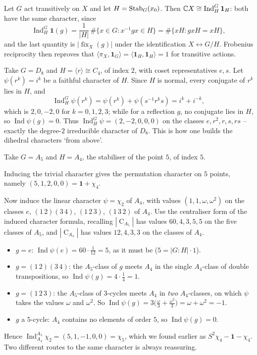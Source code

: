 \documentclass[a4paper]{scrartcl}
\newcommand{\Ind}{\operatorname{Ind}}
\newcommand{\Cent}{\operatorname{C}}
\newcommand{\ip}[2]{\langle #1, #2 \rangle}
\newcommand{\gen}[1]{\langle #1 \rangle}
\begin{document}
\begin{example}
	Let $G$ act transitively on $X$ and let $H = \operatorname{Stab}_G(x_0)$. Then $\C X \cong \Ind_H^G\mathbf 1_H$: both have the same character, since
	$$\Ind_H^G\mathbf 1(g) = \frac{1}{|H|}\,\#\{x\in G : x^{-1}gx\in H\} = \#\{xH : gxH = xH\},$$
	and the last quantity is $|\operatorname{fix}_X(g)|$ under the identification $X \leftrightarrow G/H$. Frobenius reciprocity then reproves that $\ip{\pi_X}{\mathbf 1_G} = \ip{\mathbf1_H}{\mathbf 1_H} = 1$ for transitive actions.
\end{example}

\begin{example}
	Take $G = D_8$ and $H = \gen r\cong C_4$, of index $2$, with coset representatives $e, s$. Let $\psi(r^k) = i^k$ be a faithful character of $H$. Since $H$ is normal, every conjugate of $r^k$ lies in $H$, and
	$$\Ind_H^G\psi(r^k) = \psi(r^k) + \psi(s^{-1}r^ks) = i^k + i^{-k},$$
	which is $2, 0, -2, 0$ for $k = 0,1,2,3$; while for a reflection $g$, no conjugate lies in $H$, so $\Ind\psi(g) = 0$. Thus $\Ind_H^G\psi = (2,-2,0,0,0)$ on the classes $e, r^2, r, s, rs$ -- exactly the degree-$2$ irreducible character of $D_8$. This is how one builds the dihedral characters `from above'.
\end{example}

\begin{example}
	Take $G = A_5$ and $H = A_4$, the stabiliser of the point $5$, of index $5$.

	Inducing the trivial character gives the permutation character on $5$ points, namely $(5,1,2,0,0) = \mathbf 1 + \chi_4$.

	Now induce the linear character $\psi = \chi_2$ of $A_4$, with values $(1,1,\omega,\omega^2)$ on the classes $e$, $(1\,2)(3\,4)$, $(1\,2\,3)$, $(1\,3\,2)$ of $A_4$. Use the centraliser form of the induced character formula, recalling $|\Cent_{A_5}|$ has values $60, 4, 3, 5, 5$ on the five classes of $A_5$, and $|\Cent_{A_4}|$ has values $12, 4, 3, 3$ on the classes of $A_4$.
	\begin{itemize}
		\item $g = e$: \; $\Ind\psi(e) = 60\cdot\frac{1}{12} = 5$, as it must be ($5 = |G:H|\cdot 1$).
		\item $g = (1\,2)(3\,4)$: the $A_5$-class of $g$ meets $A_4$ in the single $A_4$-class of double transpositions, so $\Ind\psi(g) = 4\cdot\frac{1}{4} = 1$.
		\item $g = (1\,2\,3)$: the $A_5$-class of $3$-cycles meets $A_4$ in \emph{two} $A_4$-classes, on which $\psi$ takes the values $\omega$ and $\omega^2$. So $\Ind\psi(g) = 3\big(\frac{\omega}{3}+\frac{\omega^2}{3}\big) = \omega+\omega^2 = -1$.
		\item $g$ a $5$-cycle: $A_4$ contains no elements of order $5$, so $\Ind\psi(g) = 0$.
	\end{itemize}
	Hence $\Ind_{A_4}^{A_5}\chi_2 = (5,1,-1,0,0) = \chi_5$, which we found earlier as $S^2\chi_4 - \mathbf 1-\chi_4$. Two different routes to the same character is always reassuring.
\end{example}
\end{document}
